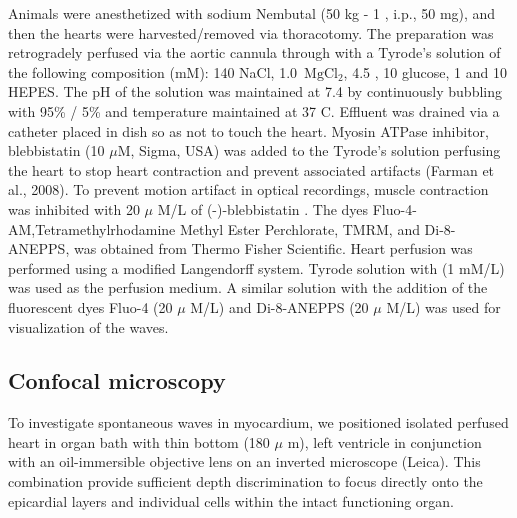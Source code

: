 \documentclass{biophys-new}
\begin{document}
Animals were anesthetized with sodium Nembutal (50 kg - 1 , i.p., 50 mg), and then the hearts were harvested/removed via thoracotomy.
The preparation was retrogradely perfused via the aortic cannula through with a Tyrode’s solution of the following composition (mM): 140 NaCl, 1.0 \(\,\mathrm{Mg}\mathrm{Cl}_2\), 4.5 , 10 glucose, 1  and 10 HEPES.
The pH of the solution was maintained at 7.4 by continuously bubbling with 95\% / 5\%  and temperature maintained at 37 C\degree.
Effluent was drained via a catheter placed in dish so as not to touch the heart.
Myosin ATPase inhibitor, blebbistatin (10 $\mu$M, Sigma, USA) was added to the Tyrode’s solution perfusing the heart to stop heart contraction and prevent associated artifacts (Farman et al., 2008).
To prevent motion artifact in optical recordings, muscle contraction was inhibited with 20 $\mu$ M/L of (-)-blebbistatin \cite{kong2014role}.
The dyes Fluo-4-AM,Tetramethylrhodamine Methyl Ester Perchlorate, TMRM, and Di-8-ANEPPS, was obtained from Thermo Fisher Scientific.
Heart perfusion was performed using a modified Langendorff system. Tyrode solution with  (1 mM/L) was used as the perfusion medium.
A similar solution with the addition of the fluorescent dyes Fluo-4 (20 $\mu$ M/L) and Di-8-ANEPPS (20 $\mu$ M/L) was used for visualization of the  waves.


\subsection*{Confocal microscopy}
To investigate spontaneous  waves in myocardium, we positioned isolated perfused heart in organ bath with thin bottom (180 $\mu$ m), left ventricle in conjunction with an oil-immersible objective lens on an inverted microscope (Leica).
This combination provide sufficient depth discrimination to focus directly onto the epicardial layers and individual cells within the intact functioning organ.
\end{document}
